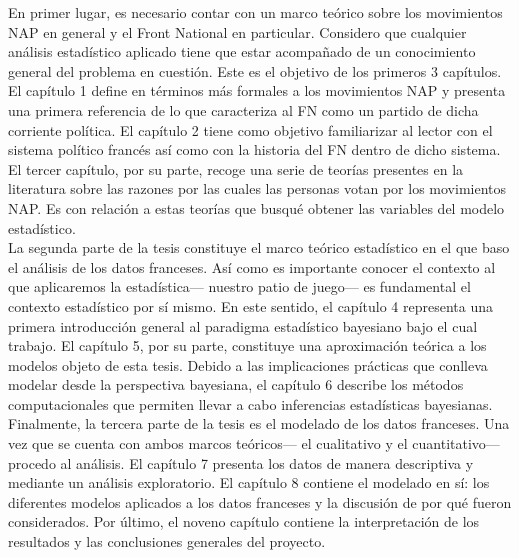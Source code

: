 En primer lugar, es necesario contar con un marco teórico sobre los movimientos NAP en general y el Front National en particular. Considero que cualquier análisis estadístico aplicado tiene que estar acompañado de un conocimiento general del problema en cuestión. Este es el objetivo de los primeros 3 capítulos. El capítulo 1 define en términos más formales a los movimientos NAP y presenta una primera referencia de lo que caracteriza al FN como un partido de dicha corriente política. El capítulo 2 tiene como objetivo familiarizar al lector con el sistema político francés así como con la historia del FN dentro de dicho sistema. El tercer capítulo, por su parte, recoge una serie de teorías presentes en la literatura sobre las razones por las cuales las personas votan por los movimientos NAP. Es con relación a estas teorías que busqué obtener las variables del modelo estadístico. \\

La segunda parte de la tesis constituye el marco teórico estadístico en el que baso el análisis de los datos franceses. Así como es importante conocer el contexto al que aplicaremos la estadística--- nuestro patio de juego--- es fundamental el contexto estadístico por sí mismo. En este sentido, el capítulo 4 representa una primera introducción general al paradigma estadístico bayesiano bajo el cual trabajo. El capítulo 5, por su parte, constituye una aproximación teórica a los modelos objeto de esta tesis. Debido a las implicaciones prácticas que conlleva modelar desde la perspectiva bayesiana, el capítulo 6 describe los métodos computacionales que permiten llevar a cabo inferencias estadísticas bayesianas.\\

Finalmente, la tercera parte de la tesis es el modelado de los datos franceses. Una vez que se cuenta con ambos marcos teóricos--- el cualitativo y el cuantitativo--- procedo al análisis. El capítulo 7 presenta los datos de manera descriptiva y mediante un análisis exploratorio. El capítulo 8 contiene el modelado en sí: los diferentes modelos aplicados a los datos franceses y la discusión de por qué fueron considerados. Por último, el noveno capítulo contiene la interpretación de los resultados y las conclusiones generales del proyecto. 
